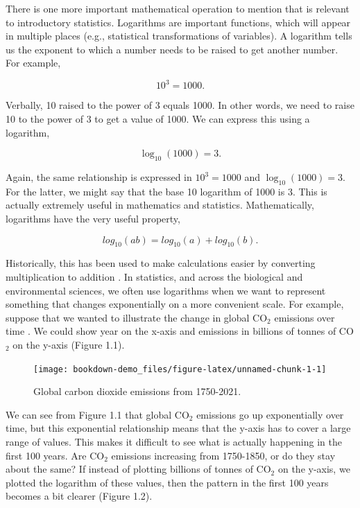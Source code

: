 \documentclass[
]{scrbook}
\begin{document}
There is one more important mathematical operation to mention that is relevant to introductory statistics.
Logarithms are important functions, which will appear in multiple places (e.g., statistical transformations of variables).
A logarithm tells us the exponent to which a number needs to be raised to get another number.
For example,

\[10^{3} = 1000.\]

Verbally, 10 raised to the power of 3 equals 1000.
In other words, we need to raise 10 to the power of 3 to get a value of 1000.
We can express this using a logarithm,

\[\log_{10}\left(1000\right) = 3.\]

Again, the same relationship is expressed in \(10^{3} = 1000\) and \(\log_{10}(1000) = 3\).
For the latter, we might say that the base 10 logarithm of 1000 is 3.
This is actually extremely useful in mathematics and statistics.
Mathematically, logarithms have the very useful property,

\[log_{10}(ab) = log_{10}(a) + log_{10}(b).\]

Historically, this has been used to make calculations easier by converting multiplication to addition \citep{Stewart2008}.
In statistics, and across the biological and environmental sciences, we often use logarithms when we want to represent something that changes exponentially on a more convenient scale.
For example, suppose that we wanted to illustrate the change in global CO\(_{2}\) emissions over time \citep{Friedlingstein2022}.
We could show year on the x-axis and emissions in billions of tonnes of CO\(_{2}\) on the y-axis (Figure 1.1).

\begin{figure}
\texttt{[image: bookdown-demo\_files/figure-latex/unnamed-chunk-1-1]} \caption{Global carbon dioxide emissions from 1750-2021.}\label{fig:unnamed-chunk-1}
\end{figure}

We can see from Figure 1.1 that global CO\(_{2}\) emissions go up exponentially over time, but this exponential relationship means that the y-axis has to cover a large range of values.
This makes it difficult to see what is actually happening in the first 100 years.
Are CO\(_{2}\) emissions increasing from 1750-1850, or do they stay about the same?
If instead of plotting billions of tonnes of CO\(_{2}\) on the y-axis, we plotted the logarithm of these values, then the pattern in the first 100 years becomes a bit clearer (Figure 1.2).
\end{document}
